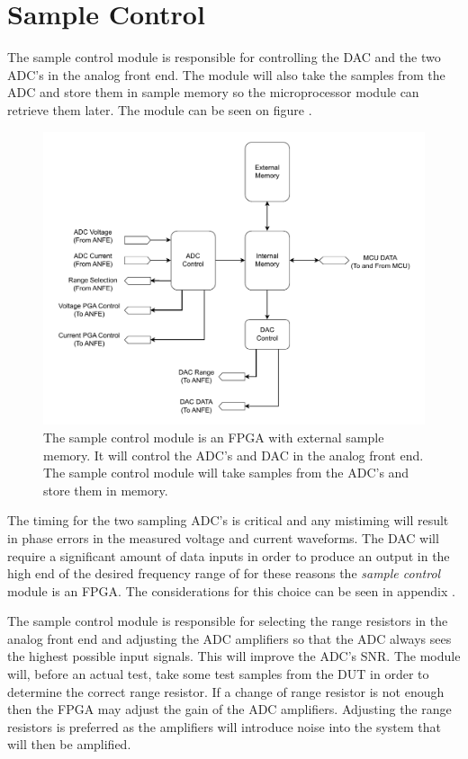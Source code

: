 \section{Sample Control} \label{sec:Sample Control}
The sample control module is responsible for controlling the DAC and the two ADC's in the analog front end. The module will also take the samples from the ADC and store them in sample memory so the microprocessor module can retrieve them later. The module can be seen on figure .

\begin{figure}[H]
    \centering
    \includegraphics[clip, trim=18 0 18 0,width=1\textwidth]{Sections/6_SystemArchitecture/Figures/SampleControlDetailedBlock.pdf}
    \caption{The sample control module is an FPGA with external sample memory. It will control the ADC's and DAC in the analog front end. The sample control module will take samples from the ADC's and store them in memory.}
    \label{fig_6_3_SampleControl}
\end{figure}

The timing for the two sampling ADC's is critical and any mistiming will result in phase errors in the measured voltage and current waveforms. The DAC will require a significant amount of data inputs in order to produce an output in the high end of the desired frequency range of  for these reasons the \textit{sample control} module is an FPGA. The considerations for this choice can be seen in appendix . 

The sample control module is responsible for selecting the range resistors in the analog front end and adjusting the ADC amplifiers so that the ADC always sees the highest possible input signals. This will improve the ADC's SNR. The module will, before an actual test, take some test samples from the DUT in order to determine the correct range resistor. If a change of range resistor is not enough then the FPGA may adjust the gain of the ADC amplifiers. Adjusting the range resistors is preferred as the amplifiers will introduce noise into the system that will then be amplified.

